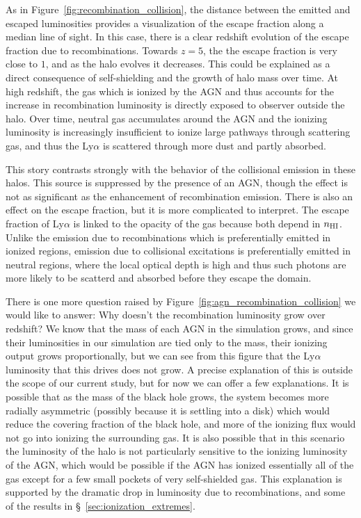As in Figure~\ref{fig:recombination_collision}, the distance between the emitted and escaped luminosities provides a visualization of the escape fraction along a median line of sight.
In this case, there is a clear redshift evolution of the escape fraction due to recombinations.
Towards $z=5$, the the escape fraction is very close to $1$, and as the halo evolves it decreases.
This could be explained as a direct consequence of self-shielding and the growth of halo mass over time.
At high redshift, the gas which is ionized by the AGN and thus accounts for the increase in recombination luminosity is directly exposed to observer outside the halo.
Over time, neutral gas accumulates around the AGN and the ionizing luminosity is increasingly insufficient to ionize large pathways through scattering gas, and thus the Ly$\alpha$ is scattered through more dust and partly absorbed.

This story contrasts strongly with the behavior of the collisional emission in these halos.
This source is suppressed by the presence of an AGN, though the effect is not as significant as the enhancement of recombination emission.
There is also an effect on the escape fraction, but it is more complicated to interpret.
The escape fraction of Ly$\alpha$ is linked to the opacity of the gas because both depend in $n_{\rm{HI}}$.
Unlike the emission due to recombinations which is preferentially emitted in ionized regions, emission due to collisional excitations is preferentially emitted in neutral regions, where the local optical depth is high and thus such photons are more likely to be scatterd and absorbed before they escape the domain.

There is one more question raised by Figure~\ref{fig:agn_recombination_collision} we would like to answer: Why doesn't the recombination luminosity grow over redshift?
We know that the mass of each AGN in the simulation grows, and since their luminosities in our simulation are tied only to the mass, their ionizing output grows proportionally, but we can see from this figure that the Ly$\alpha$ luminosity that this drives does not grow.
A precise explanation of this is outside the scope of our current study, but for now we can offer a few explanations.
It is possible that as the mass of the black hole grows, the system becomes more radially asymmetric (possibly because it is settling into a disk) which would reduce the covering fraction of the black hole, and more of the ionizing flux would not go into ionizing the surrounding gas.
It is also possible that in this scenario the luminosity of the halo is not particularly sensitive to the ionizing luminosity of the AGN, which would be possible if the AGN has ionized essentially all of the gas except for a few small pockets of very self-shielded gas.
This explanation is supported by the dramatic drop in luminosity due to recombinations, and some of the results in \S~\ref{sec:ionization_extremes}.

